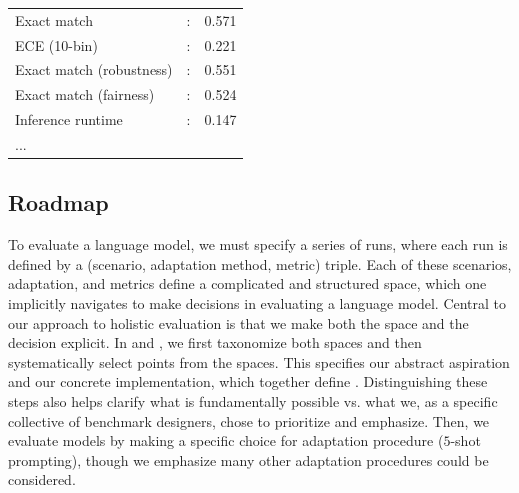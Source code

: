 \begin{center}
\begin{tabular}{lcl}
\hline
Exact match & : & 0.571 \\
ECE (10-bin) & : & 0.221 \\
Exact match (robustness) & : & 0.551 \\
Exact match (fairness) & : & 0.524 \\
Inference runtime & : & 0.147 \\
...  \\
\hline
\end{tabular}
\end{center}




\hypertarget{preliminaries-roadmap}{\subsection{Roadmap}}
\label{sec:preliminaries-roadmap}

To evaluate a language model, we must specify a series of runs, where each run is defined by a (scenario, adaptation method, metric) triple.
Each of these scenarios, adaptation, and metrics define a complicated and structured space, which one implicitly navigates to make decisions in evaluating a language model.
Central to our approach to holistic evaluation is that we make both the space and the decision explicit.
In  and , we first taxonomize both spaces and then systematically select points from the spaces.
This specifies our abstract aspiration and our concrete implementation, which together define \benchmarkname.  
Distinguishing these steps also helps clarify what is fundamentally possible vs. what we, as a specific collective of benchmark designers, chose to prioritize and emphasize. 
Then, we evaluate \nummodels models by making a specific choice for adaptation procedure (\ie $5$-shot prompting), though we emphasize many other adaptation procedures could be considered.